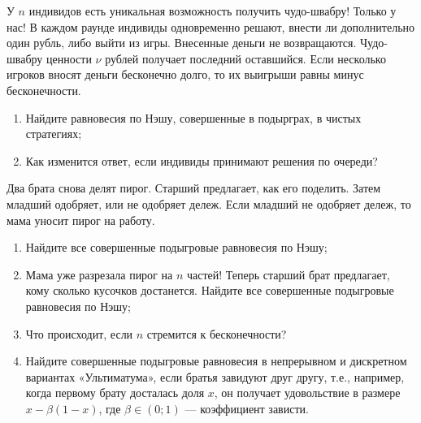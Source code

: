 \begin{problem}[«Лохотрон-??»]
У  $n$  индивидов есть уникальная возможность получить чудо-швабру! Только у нас! В каждом раунде индивиды одновременно решают, внести ли дополнительно один рубль, либо выйти из игры. Внесенные деньги не возвращаются. Чудо-швабру ценности  $\nu $  рублей получает последний оставшийся. Если несколько игроков вносят деньги бесконечно долго, то их выигрыши равны минус бесконечности.\par
\begin{enumerate}
\item Найдите равновесия по Нэшу, совершенные в подырграх, в чистых стратегиях;\par
\item Как изменится ответ, если индивиды принимают решения по очереди?\par
\end{enumerate}


\begin{sol}

\end{sol}
\end{problem}



\begin{problem}[Ультиматум {[О]}]
Два брата снова делят пирог. Старший предлагает, как его поделить. Затем младший одобряет, или не одобряет дележ. Если младший не одобряет дележ, то мама уносит пирог на работу.\par
\begin{enumerate}
\item Найдите все совершенные подыгровые равновесия по Нэшу;\par
\item Мама уже разрезала пирог на  $n$  частей! Теперь старший брат предлагает, кому сколько кусочков достанется. Найдите все совершенные подыгровые равновесия по Нэшу;\par
\item  Что происходит, если  $n$  стремится к бесконечности?\par
\item Найдите совершенные подыгровые равновесия в непрерывном и дискретном вариантах «Ультиматума», если братья завидуют друг другу, т.е., например, когда первому брату досталась доля  $x$, он получает удовольствие в размере  $x-\beta \left(1-x\right)$, где  $\beta \in \left(0;1\right)$  — коэффициент зависти.
\end{enumerate}


\begin{sol}

\end{sol}
\end{problem}





